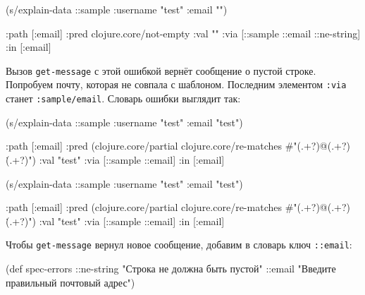 \else

\begin{english}
  \begin{clojure}
(s/explain-data ::sample {:username "test" :email ""})

{:path [:email]
 :pred clojure.core/not-empty
 :val ""
 :via [::sample ::email ::ne-string]
 :in [:email]}
  \end{clojure}
\end{english}

\fi

Вызов \verb|get-message| с этой ошибкой вернёт сообщение о пустой
строке. Попробуем почту, которая не совпала с шаблоном. Последним элементом
\verb|:via| станет \verb|:sample/email|. Словарь ошибки выглядит так:

\ifx\DEVICETYPE\MOBILE

\begin{english}
  \begin{clojure}
(s/explain-data ::sample
  {:username "test" :email "test"})

{:path [:email]
 :pred
 (clojure.core/partial
  clojure.core/re-matches
  #"(.+?)@(.+?)\.(.+?)")
 :val "test"
 :via [::sample ::email]
 :in [:email]}
  \end{clojure}
\end{english}

\else

\begin{english}
  \begin{clojure}
(s/explain-data ::sample {:username "test" :email "test"})

{:path [:email]
 :pred
 (clojure.core/partial
  clojure.core/re-matches
  #"(.+?)@(.+?)\.(.+?)")
 :val "test"
 :via [::sample ::email]
 :in [:email]}
  \end{clojure}
\end{english}

\fi

Чтобы \verb|get-message| вернул новое сообщение, добавим в словарь ключ
\verb|::email|:

\ifx\DEVICETYPE\MOBILE

  \begin{clojure}
(def spec-errors
  {::ne-string
   "Строка не должна быть пустой"
   ::email
   "Введите правильный почтовый адрес"})
  \end{clojure}

\else

